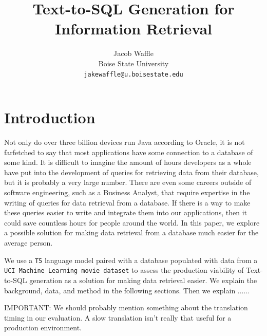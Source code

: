 \documentclass[11pt]{article}
\title{Text-to-SQL Generation for Information Retrieval}
\author{
    Jacob Waffle \\
    Boise State University\\
    \texttt{jakewaffle@u.boisestate.edu} \\
}
\begin{document}
\maketitle
\begin{abstract}

\end{abstract}

\section{Introduction}

Not only do over three billion devices run Java according to Oracle, it is not farfetched to say that most applications have some connection to a database of some kind. It is difficult to imagine the amount of hours developers as a whole have put into the development of queries for retrieving data from their database, but it is probably a very large number. There are even some careers outside of software engineering, such as a Business Analyst, that require expertise in the writing of queries for data retrieval from a database. If there is a way to make these queries easier to write and integrate them into our applications, then it could save countless hours for people around the world. In this paper, we explore a possible solution for making data retrieval from a database much easier for the average person.

We use a \texttt{T5} language model \citep{raffel2020exploring} paired with a database populated with data from a \texttt{UCI Machine Learning movie dataset} \citep{misc_movie_132} to assess the production viability of Text-to-SQL generation as a solution for making data retrieval easier. We explain the background, data, and method in the following sections. Then we explain ......



IMPORTANT: We should probably mention something about the translation timing in our evaluation. A slow translation isn't really that useful for a production environment.



\end{document}
